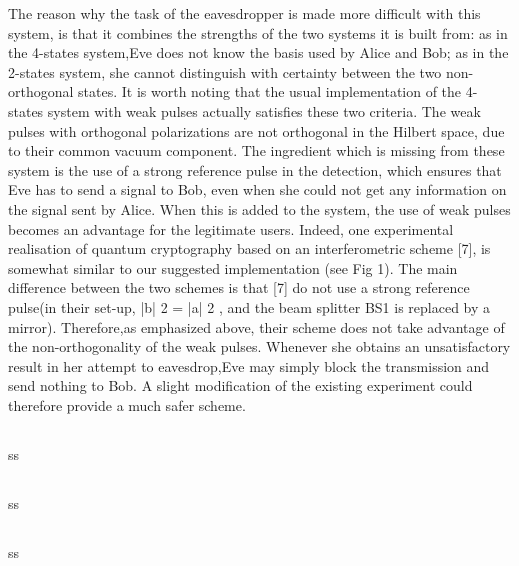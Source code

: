 The reason why the task of the eavesdropper is made more difficult with this system, is that it combines the strengths of the two systems it is built from: as in the 4-states system,Eve does not know the basis used by Alice and Bob; as in the 2-states system, she cannot distinguish with certainty between the two non-orthogonal states. It is worth noting that the usual implementation of the 4-states system with weak pulses actually satisfies these two criteria. The weak pulses with orthogonal polarizations are not orthogonal in the Hilbert space, due to their common vacuum component. The ingredient which is missing from these system is the use of a strong reference pulse in the detection, which ensures that Eve has to send a signal to Bob, even when she could not get any information on the signal sent by Alice. When this is added to the system, the use of weak pulses becomes an advantage for the legitimate users. Indeed, one experimental realisation of quantum cryptography based on an interferometric scheme [7], is somewhat similar to our suggested implementation (see Fig 1). The main difference between the two schemes is that [7] do not use a strong reference pulse(in their set-up, |b| 2 = |a| 2 , and the beam splitter BS1 is replaced by a mirror). Therefore,as emphasized above, their scheme does not take advantage of the non-orthogonality of the weak pulses. Whenever she obtains an unsatisfactory result in her attempt to eavesdrop,Eve may simply block the transmission and send nothing to Bob. A slight modification of the existing experiment could therefore provide a much safer scheme.

\subsection{\trnas}
ss
\subsection{\review}
ss
\subsection{\dic}
ss